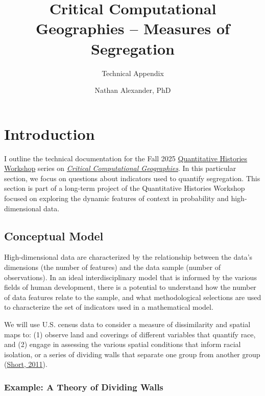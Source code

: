 \documentclass[
  letterpaper,
  DIV=11,
  numbers=noendperiod]{scrartcl}
\title{Critical Computational Geographies -- Measures of Segregation}
\subtitle{Technical Appendix}
\author{Nathan Alexander, PhD}
\date{}
\begin{document}
\maketitle


\section{Introduction}\label{introduction}

I outline the technical documentation for the Fall 2025
\href{quant-shop.github.io}{Quantitative Histories Workshop} series on
\href{https://quant-shop.github.io/events.html\#fall}{\emph{Critical
Computational Geographies}}. In this particular section, we focus on
questions about indicators used to quantify segregation. This section is
part of a long-term project of the Quantitative Histories Workshop
focused on exploring the dynamic features of context in probability and
high-dimensional data.

\subsection{Conceptual Model}\label{conceptual-model}

High-dimensional data are characterized by the relationship between the
data's dimensions (the number of features) and the data sample (number
of observations). In an ideal interdisciplinary model that is informed
by the various fields of human development, there is a potential to
understand how the number of data features relate to the sample, and
what methodological selections are used to characterize the set of
indicators used in a mathematical model.

We will use U.S. census data to consider a measure of dissimilarity and
spatial maps to: (1) observe land and coverings of different variables
that quantify race, and (2) engage in assessing the various spatial
conditions that inform racial isolation, or a series of dividing walls
that separate one group from another group
(\href{https://plus.maths.org/content/dividing-walls-topology-and-topography-i}{Short,
2011}).

\subsubsection{Example: A Theory of Dividing
Walls}\label{example-a-theory-of-dividing-walls}
\end{document}
